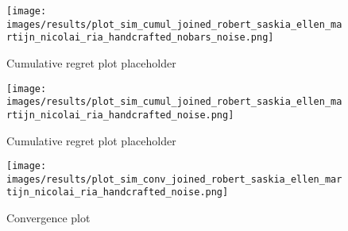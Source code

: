 \begin{figure}[ht]
	\centering
	\texttt{[image: images/results/plot\_sim\_cumul\_joined\_robert\_saskia\_ellen\_martijn\_nicolai\_ria\_handcrafted\_nobars\_noise.png]}
	\caption{Cumulative regret plot placeholder}
	\label{fig:cumul_nobars_noise_placeholder2}
\end{figure}
\begin{figure}[ht]
	\centering
	\texttt{[image: images/results/plot\_sim\_cumul\_joined\_robert\_saskia\_ellen\_martijn\_nicolai\_ria\_handcrafted\_noise.png]}
	\caption{Cumulative regret plot placeholder}
	\label{fig:cumul_noise_placeholder2}
\end{figure}
\begin{figure}[ht]
	\centering
	\texttt{[image: images/results/plot\_sim\_conv\_joined\_robert\_saskia\_ellen\_martijn\_nicolai\_ria\_handcrafted\_noise.png]}
	\caption{Convergence plot}
	\label{fig:conv_noise_placeholder2}
\end{figure}
